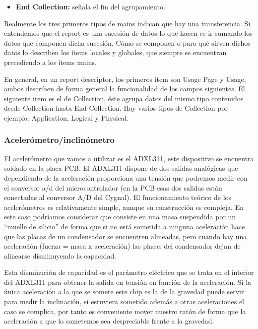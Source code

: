 \documentclass[a4paper, 11pt]{article}
\begin{document}
\begin{enumerate}
\begin{itemize}
            \item \textbf{End Collection:} señala el fin del agrupamiento.
        \end{itemize}

        Realmente los tres primeros tipos de mains indican que hay una
        transferencia.  Si entendemos que el report es una sucesión de datos lo
        que hacen es ir sumando los datos que componen dicha sucesión. Cómo se
        componen o para qué sirven dichos datos lo describen los ítems locales
        y globales, que siempre se encuentran precediendo a los ítems mains.

        En general, en un report descriptor, los primeros item son Usage Page y
        Usage, ambos describen de forma general la funcionalidad de los campos
        siguientes.  El siguiente item es el de Collection, éste agrupa datos
        del mismo tipo contenidos desde Collection hasta End Collection. Hay
        varios tipos de Collection por ejemplo: Application, Logical y
        Physical.
\end{enumerate}

\subsubsection{Acelerómetro/inclinómetro}

El acelerómetro que vamos a utilizar es el ADXL311, este dispositivo se
encuentra soldado en la placa PCB. El ADXL311 dispone de dos salidas analógicas
que dependiendo de la aceleración proporciona una tensión que podremos medir
con el conversor a/d del microcontrolador (en la PCB esas dos salidas están
conectadas al conversor A/D del Cygnal). El funcionamiento teórico de los
acelerómetros es relativamente simple, aunque su construcción es compleja. En
este caso podríamos considerar que consiste en una masa suspendida por un
“muelle de silicio” de forma que si no está sometida a ninguna aceleración hace
que las placas de un condensador se encuentren alineadas, pero cuando hay una
aceleración (fuerza = masa x aceleración) las placas del condensador dejan de
alinearse disminuyendo la capacidad.

Esta disminución de capacidad es el parámetro eléctrico que se trata en el
interior del ADXL311 para obtener la salida en tensión en función de la
aceleración. Si la única aceleración a la que se somete este chip es la de la
gravedad puede servir para medir la inclinación, si estuviera sometido además a
otras aceleraciones el caso se complica, por tanto es conveniente mover nuestro
ratón de forma que la aceleración a que lo sometemos sea despreciable frente a
la gravedad.
\end{document}
